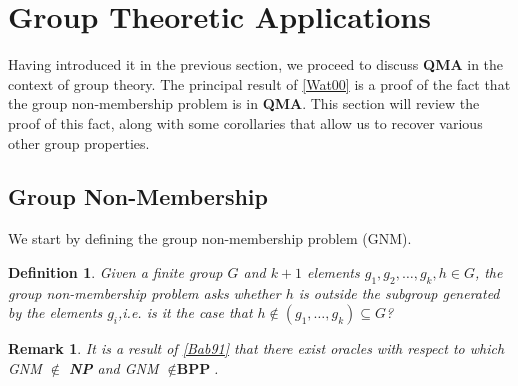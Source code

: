 \documentclass[12pt]{article}
\newtheorem{defn}{Definition}
\newtheorem{rmk}{Remark}
\numberwithin{thm}{section}
\numberwithin{defn}{section}
\numberwithin{prop}{section}
\numberwithin{rmk}{section}
\begin{document}
    \section{Group Theoretic Applications}
    Having introduced it in the previous section, we proceed to discuss \textbf{QMA} in the context of group theory. The principal result of \hyperref[wat00]{[Wat00]} is a proof of the fact that the group non-membership problem is in \textbf{QMA}. This section will review the proof of this fact, along with some corollaries that allow us to recover various other group properties. 
    \subsection{Group Non-Membership}
    We start by defining the group non-membership problem (GNM).
    \begin{defn}
    	Given a finite group $G$ and $k+1$ elements $g_1,g_2,\dots,g_k,h\in G$, the group non-membership problem asks whether $h$ is outside the subgroup generated by the elements $g_i$,i.e. is it the case that $h\notin (g_1,\dots,g_k)\subseteq G$?
    \end{defn}
	\begin{rmk}
	It is a result of \hyperref[bab91]{[Bab91]} that there exist oracles with respect to which GNM $\notin$ \textbf{NP} and GNM $\notin\textbf{BPP}$.
	\end{rmk}
	
\end{document}
